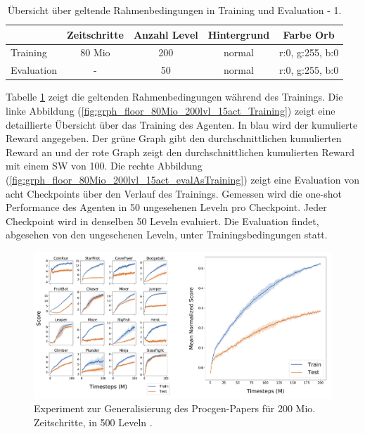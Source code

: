 \begin{center}
 \begin{table}[htb!]
 \begin{center}
  \begin{tabular}{ l c c c c }
    \hline
		      & Zeitschritte & Anzahl Level & Hintergrund & Farbe Orb \\ \hline \hline
     Training     & 80 Mio       & 200		 & 	    normal & r:0, g:255, b:0 \\ \hline
     Evaluation & - 	           & 50		 & 	    normal & r:0, g:255, b:0 \\ \hline
    \hline
  \end{tabular}
  \caption{Übersicht über geltende Rahmenbedingungen in Training und Evaluation - 1.}
  \label{tab:tab_durch_EXP_trainSetting1}
  \end{center}
 \end{table}
\end{center} 

Tabelle \ref{tab:tab_durch_EXP_trainSetting1} zeigt die geltenden Rahmenbedingungen während des Trainings. Die linke Abbildung (\ref{fig:grph_floor_80Mio_200lvl_15act_Training}) zeigt eine detaillierte Übersicht über das Training des Agenten. In blau wird der kumulierte Reward angegeben. Der grüne Graph gibt den durchschnittlichen kumulierten Reward an und der rote Graph zeigt den durchschnittlichen kumulierten Reward mit einem SW von 100. Die rechte Abbildung (\ref{fig:grph_floor_80Mio_200lvl_15act_evalAsTraining}) zeigt eine Evaluation von acht Checkpoints über den Verlauf des Trainings. Gemessen wird die one-shot Performance des Agenten in 50 ungesehenen Leveln pro Checkpoint. Jeder Checkpoint wird in denselben 50 Leveln evaluiert. Die Evaluation findet, abgesehen von den ungesehenen Leveln, unter Trainingsbedingungen statt. 

\begin{figure}[htb!]
    \begin{minipage}{\linewidth}
        \centering
        \includegraphics[scale=0.4]{abb/_graphen/procgen_fig4}
        \caption{Experiment zur Generalisierung des Procgen-Papers für 200 Mio. Zeitschritte, in 500 Leveln \cite{cobbe2019procgen}.}
        \label{generalization_500lvl_procgen}
    \end{minipage}
\end{figure}



